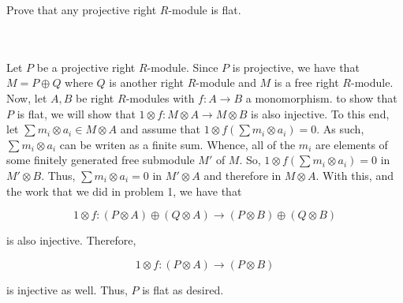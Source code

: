 Prove that any projective right $R$-module is flat.\\\\

\begin{solution}\renewcommand{\qedsymbol}{}\ \\

    Let $P$ be a projective right $R$-module. Since $P$ is projective, we have that $M=P\oplus Q$ where
    $Q$ is another right $R$-module and $M$ is a free right $R$-module. Now, let $A,B$ be right
    $R$-modules with $f:A\to B$ a monomorphism. to show that $P$ is flat, we will show that
    $1\otimes f:M\otimes A\to M\otimes B$ is also injective. To this end, let
    $\sum m_i\otimes a_i\in M\otimes A$ and assume that $1\otimes f(\sum m_i\otimes a_i)=0$. As such,
    $\sum m_i\otimes a_i$ can be writen as a finite sum. Whence, all of the $m_i$ are elements of some
    finitely generated free submodule $M'$ of $M$. So, $1\otimes f(\sum m_i\otimes a_i)=0$ in 
    $M'\otimes B$. Thus, $\sum m_i\otimes a_i=0$ in $M'\otimes A$ and therefore in $M\otimes A$. With
    this, and the work that we did in problem 1, we have that

    $$1\otimes f:(P\otimes A)\oplus(Q\otimes A)\to (P\otimes B)\oplus(Q\otimes B)$$

    is also injective. Therefore,
    
    $$1\otimes f:(P\otimes A)\to (P\otimes B)$$

    is injective as well. Thus, $P$ is flat as desired.

\end{solution}